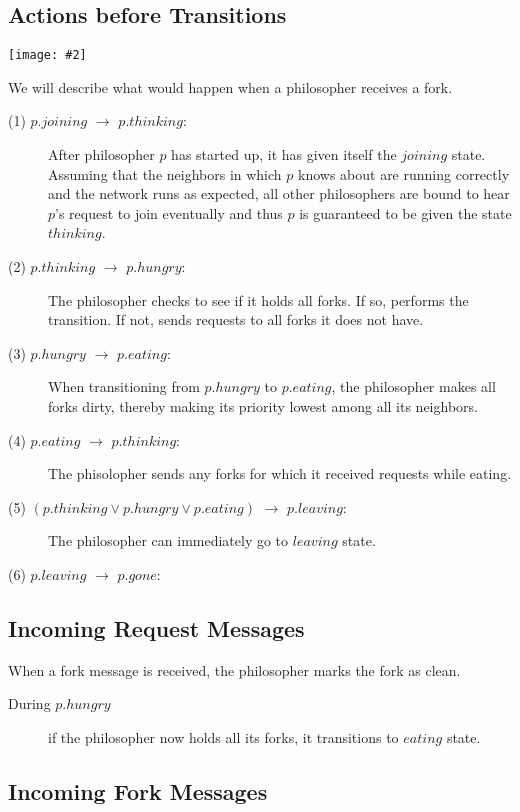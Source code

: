 \documentclass[11pt]{article}
\newcommand{\pic}[2]{\begin{center}\texttt{[image: \#2]}\end{center}}
\begin{document}
\subsection{Actions before Transitions}
\pic{0.6}{diagram}
We will describe what would happen when a philosopher receives a fork.
\begin{description}
\item[(1) $p.joining$ $\to$ $p.thinking$:] After philosopher $p$ has started up, it has given itself the $joining$ state. Assuming that the neighbors in which $p$ knows about are running correctly and the network runs as expected, all other philosophers are bound to hear $p$'s request to join eventually and thus $p$ is guaranteed to be given the state $thinking$.

\item[(2) $p.thinking$ $\to$ $p.hungry$:]
The philosopher checks to see if it holds all forks. If so, performs the transition. If not, sends requests to all forks it does not have.

\item[(3) $p.hungry$ $\to$ $p.eating$:] 
When transitioning from $p.hungry$ to $p.eating$, the philosopher makes all forks dirty, thereby making its priority lowest among all its neighbors.


\item[(4) $p.eating$ $\to$ $p.thinking$:]
The phisolopher sends any forks for which it received requests while eating.

\item[(5) $(p.thinking \vee p.hungry \vee p.eating)$ $\to$ $p.leaving$:]
The philosopher can immediately go to $leaving$ state.

\item[(6) $p.leaving$ $\to$ $p.gone$:]
\end{description}
\subsection{Incoming Request Messages}
When a fork message is received, the philosopher marks the fork as clean.

\begin{description}
\item[During $p.hungry$] if the philosopher now holds all its forks, it transitions to $eating$ state.
\end{description}
\subsection{Incoming Fork Messages}
\end{document}
